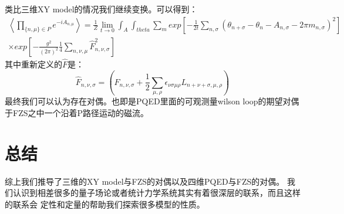 \documentclass{article}
\begin{document}
类比三维XY model的情况我们继续变换。可以得到：
\begin{equation}
    \begin{split}
        \left\langle \prod_{\{ n,\mu \} \in P} e^{-i A_{n,\mu}} \right\rangle   = \frac{1}{Z} \lim_{t \to 0} \int_A \int_{theta} \sum_{m} exp \left[ - \frac{1}{2t} \sum_{n,\sigma} \left( \theta_{n+\sigma} - \theta_n - A_{n,\sigma} - 2 \pi m_{n,\sigma} \right)^2  \right] \\
        \times exp\left[ - \frac{g^2}{(2\pi)^2} \frac{1}{4} \sum_{n,\nu,\mu} \hat F_{n,\nu,\sigma}^2 \right] 
    \end{split}
\end{equation}
其中重新定义的$\hat F$是：
\begin{equation}
    \hat F_{n,\nu,\sigma} = \left(F_{n,\nu,\sigma}+ \frac{1}{2} \sum_{\mu,\rho} \epsilon_{\nu\sigma\mu\rho} L_{n+\nu+\sigma,\mu,\rho}\right) 
\end{equation}
最终我们可以认为存在对偶。也即是PQED里面的可观测量wilson loop的期望对偶于FZS之中一个沿着P路径运动的磁流。


\section{总结}
综上我们推导了三维的XY model与FZS的对偶以及四维PQED与FZS的对偶。
我们认识到相差很多的量子场论或者统计力学系统其实有着很深层的联系，而且这样的联系会
定性和定量的帮助我们探索很多模型的性质。
\end{document}
